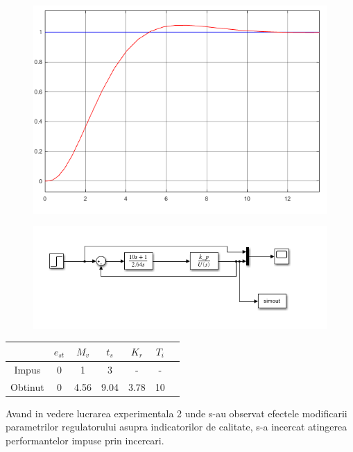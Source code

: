 \documentclass[11pt]{article}
\begin{document}
\begin{figure}[H]
	\centering
	\begin{minipage}{.4\textwidth}
		\centering
		\includegraphics[width=.9\linewidth]{CMVK.png}
		\label{fig:test1}
	\end{minipage}%
	\begin{minipage}{.6\textwidth}
		\centering
		\includegraphics[width=.9\linewidth]{sim_cmvk.png}
		\label{fig:test2}
	\end{minipage}
\end{figure}
\begin{center}
	\begin{tabular}{|c|c|c|c|c|c|c|}
		\hline
		&$e_{st}$&$M_v$&$t_s$&$K_r$&$T_i$\\
		\hline
		Impus&0&1&3&-&-\\
		\hline
		Obtinut&0&4.56&9.04&3.78&10\\
		\hline
	\end{tabular}
\end{center}
Avand in vedere lucrarea experimentala 2 unde s-au observat efectele modificarii parametrilor regulatorului asupra indicatorilor de calitate, s-a incercat atingerea performantelor impuse prin incercari.
\end{document}
